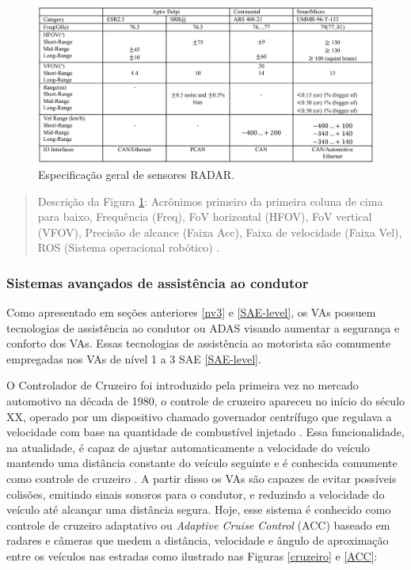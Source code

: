 \begin{figure}[H]
\centering
\includegraphics[width=\textwidth]{Figures/radar-table.png}
\caption{Especificação geral de sensores RADAR.}
\label{tabela-radar}
\end{figure}

\begin{quote}

Descrição da Figura \ref{tabela-radar}:  Acrônimos primeiro da primeira coluna de cima para baixo, Frequência (Freq), FoV horizontal (HFOV), FoV vertical (VFOV), Precisão de alcance (Faixa Acc), Faixa de velocidade (Faixa Vel), ROS (Sistema operacional robótico) \cite{sensors}.
\end{quote}


\subsubsection{Sistemas avançados de assistência ao condutor} \label{adas}


Como apresentado em seções anteriores \ref{nv3} e \ref{SAE-level}, os VAs possuem tecnologias de assistência ao condutor ou ADAS visando aumentar a segurança e conforto dos VAs. Essas tecnologias de assistência ao motorista são comumente empregadas nos VAs de nível 1 a 3 SAE \ref{SAE-level}.

 \label{cruzeiroo}

O Controlador de Cruzeiro foi introduzido pela primeira vez no mercado automotivo na década de 1980, o controle de cruzeiro apareceu no início do século XX, operado por um dispositivo chamado governador centrífugo que regulava a velocidade com base na quantidade de combustível injetado \cite{caio}. Essa funcionalidade, na atualidade, é capaz de ajustar automaticamente a velocidade do veículo mantendo uma distância constante do veículo seguinte e é conhecida comumente como controle de cruzeiro \cite{sensors-yet}.
A partir disso os VAs são capazes de evitar possíveis colisões, emitindo sinais sonoros para o condutor, e reduzindo a velocidade do veículo até alcançar uma distância segura. Hoje, esse sistema é conhecido como controle de cruzeiro adaptativo ou \textit{Adaptive Cruise Control} (ACC) baseado em radares e câmeras que medem a distância, velocidade e ângulo de aproximação entre os veículos nas estradas como ilustrado nas Figuras \ref{cruzeiro} e \ref{ACC}:

